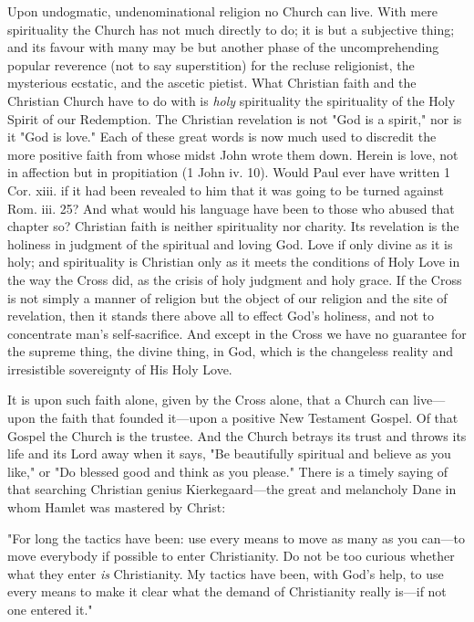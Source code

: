 \documentclass[12pt,a5paper,twoside,titlepage]{book}
\begin{document}
Upon undogmatic, undenominational religion 
no Church can live. With mere spirituality the 
Church has not much directly to do; it is but 
a subjective thing; and its favour with many 
may be but another phase of the uncomprehending 
popular reverence (not to say superstition) 
for the recluse religionist, the mysterious 
ecstatic, and the ascetic pietist. What Christian 
faith and the Christian Church have to do with 
is \textit{holy} spirituality the spirituality of the Holy 
Spirit of our Redemption. The Christian revelation 
is not "God is a spirit," nor is it "God 
is love." Each of these great words is now 
much used to discredit the more positive faith 
from whose midst John wrote them down. 
Herein is love, not in affection but in propitiation 
(1 John iv. 10). Would Paul ever 
have written 1 Cor. xiii. if it had been revealed 
to him that it was going to be turned against 
Rom. iii. 25? And what would his language 
have been to those who abused that chapter 
so? Christian faith is neither spirituality nor 
charity. Its revelation is the holiness in judgment 
of the spiritual and loving God. Love 
if only divine as it is holy; and spirituality is 
Christian only as it meets the conditions of 
Holy Love in the way the Cross did, as the 
crisis of holy judgment and holy grace. If 
the Cross is not simply a manner of religion 
but the object of our religion and the site 
of revelation, then it stands there above all 
to effect God's holiness, and not to concentrate 
man's self-sacrifice. And except in the 
Cross we have no guarantee for the supreme 
thing, the divine thing, in God, which is the 
changeless reality and irresistible sovereignty 
of His Holy Love. 

It is upon such faith alone, given by the Cross 
alone, that a Church can live---upon the faith 
that founded it---upon a positive New Testament 
Gospel. Of that Gospel the Church is 
the trustee. And the Church betrays its trust 
and throws its life and its Lord away when it 
says, "Be beautifully spiritual and believe as 
you like," or "Do blessed good and think as you 
please." 
There is a timely saying of that searching 
Christian genius Kierkegaard---the great and 
melancholy Dane in whom Hamlet was mastered 
by Christ: 

"For long the tactics have been: use every 
means to move as many as you can---to move 
everybody if possible to enter Christianity. 
Do not be too curious whether what they enter 
\textit{is} Christianity. My tactics have been, with 
God's help, to use every means to make it clear 
what the demand of Christianity really is---if 
not one entered it." 
\end{document}
